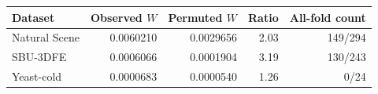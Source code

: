 \begin{center}
\begin{tabular}{lrrrr}
\hline
Dataset & Observed $W$ & Permuted $W$ & Ratio & All-fold count\\
\hline
Natural Scene & 0.0060210 & 0.0029656 & 2.03 & 149/294\\
SBU-3DFE & 0.0006066 & 0.0001904 & 3.19 & 130/243\\
Yeast-cold & 0.0000683 & 0.0000540 & 1.26 & 0/24\\
\hline
\end{tabular}
\end{center}